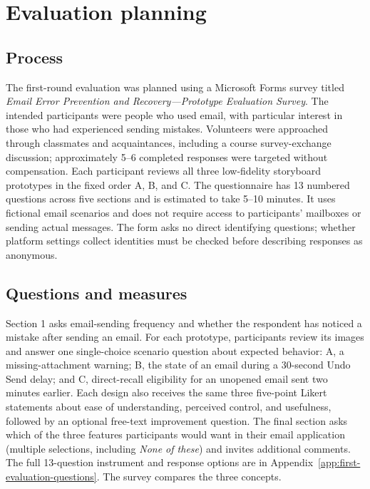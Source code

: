 \documentclass[letterpaper]{jdf}
\begin{document}
\section{Evaluation planning}
\subsection{Process}
The first-round evaluation was planned using a Microsoft Forms survey titled \emph{Email Error Prevention and Recovery---Prototype Evaluation Survey}. The intended participants were people who used email, with particular interest in those who had experienced sending mistakes. Volunteers were approached through classmates and acquaintances, including a course survey-exchange discussion; approximately 5--6 completed responses were targeted without compensation. Each participant reviews all three low-fidelity storyboard prototypes in the fixed order A, B, and C. The questionnaire has 13 numbered questions across five sections and is estimated to take 5--10 minutes. It uses fictional email scenarios and does not require access to participants' mailboxes or sending actual messages. The form asks no direct identifying questions; whether platform settings collect identities must be checked before describing responses as anonymous.
\subsection{Questions and measures}
Section 1 asks email-sending frequency and whether the respondent has noticed a mistake after sending an email. For each prototype, participants review its images and answer one single-choice scenario question about expected behavior: A, a missing-attachment warning; B, the state of an email during a 30-second Undo Send delay; and C, direct-recall eligibility for an unopened email sent two minutes earlier. Each design also receives the same three five-point Likert statements about ease of understanding, perceived control, and usefulness, followed by an optional free-text improvement question. The final section asks which of the three features participants would want in their email application (multiple selections, including \emph{None of these}) and invites additional comments. The full 13-question instrument and response options are in Appendix~\ref{app:first-evaluation-questions}. The survey compares the three concepts.
\end{document}
